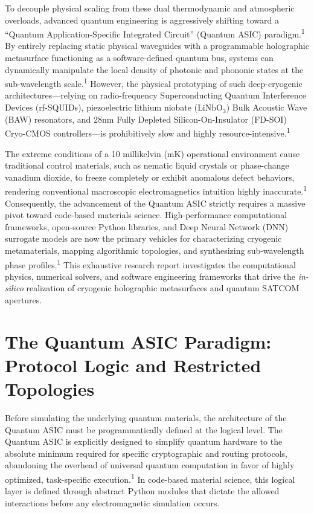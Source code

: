\documentclass[11pt, a4paper]{article}
\begin{document}
To decouple physical scaling from these dual thermodynamic and atmospheric overloads, advanced quantum engineering is aggressively shifting toward a ``Quantum Application-Specific Integrated Circuit'' (Quantum ASIC) paradigm.\textsuperscript{1} By entirely replacing static physical waveguides with a programmable holographic metasurface functioning as a software-defined quantum bus, systems can dynamically manipulate the local density of photonic and phononic states at the sub-wavelength scale.\textsuperscript{1} However, the physical prototyping of such deep-cryogenic architectures---relying on radio-frequency Superconducting Quantum Interference Devices (rf-SQUIDs), piezoelectric lithium niobate ($\text{LiNbO}_3$) Bulk Acoustic Wave (BAW) resonators, and 28nm Fully Depleted Silicon-On-Insulator (FD-SOI) Cryo-CMOS controllers---is prohibitively slow and highly resource-intensive.\textsuperscript{1}

The extreme conditions of a 10 millikelvin (mK) operational environment cause traditional control materials, such as nematic liquid crystals or phase-change vanadium dioxide, to freeze completely or exhibit anomalous defect behaviors, rendering conventional macroscopic electromagnetics intuition highly inaccurate.\textsuperscript{1} Consequently, the advancement of the Quantum ASIC strictly requires a massive pivot toward code-based materials science. High-performance computational frameworks, open-source Python libraries, and Deep Neural Network (DNN) surrogate models are now the primary vehicles for characterizing cryogenic metamaterials, mapping algorithmic topologies, and synthesizing sub-wavelength phase profiles.\textsuperscript{1} This exhaustive research report investigates the computational physics, numerical solvers, and software engineering frameworks that drive the \textit{in-silico} realization of cryogenic holographic metasurfaces and quantum SATCOM apertures.

\section{The Quantum ASIC Paradigm: Protocol Logic and Restricted Topologies}

Before simulating the underlying quantum materials, the architecture of the Quantum ASIC must be programmatically defined at the logical level. The Quantum ASIC is explicitly designed to simplify quantum hardware to the absolute minimum required for specific cryptographic and routing protocols, abandoning the overhead of universal quantum computation in favor of highly optimized, task-specific execution.\textsuperscript{1} In code-based material science, this logical layer is defined through abstract Python modules that dictate the allowed interactions before any electromagnetic simulation occurs.
\end{document}
